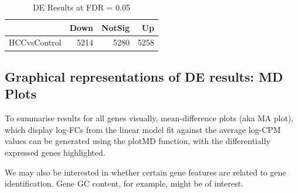 \documentclass[
]{book}
\begin{document}
\begin{table}

\caption{\label{tab:hcc5hmC-preproc-lmFit}DE Results at FDR = 0.05}
\centering
\begin{tabular}[t]{l|r|r|r}
\hline
  & Down & NotSig & Up\\
\hline
HCCvsControl & 5214 & 5280 & 5258\\
\hline
\end{tabular}
\end{table}

\hypertarget{graphical-representations-of-de-results-md-plots}{%
\subsection*{Graphical representations of DE results: MD Plots}\label{graphical-representations-of-de-results-md-plots}}

To summarise results for all genes visually, mean-difference plots
(aka MA plot), which display log-FCs from the linear model fit against
the average log-CPM values can be generated using the plotMD function,
with the differentially expressed genes highlighted.

We may also be interested in whether certain gene features are
related to gene identification. Gene GC content, for example, might be
of interest.
\end{document}
